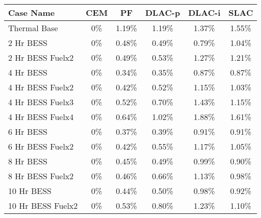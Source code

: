 \begin{tabular}{lccccc}
\toprule
Case Name & CEM & PF & DLAC-p & DLAC-i & SLAC \\
\midrule
Thermal Base & 0\% & 1.19\% & 1.19\% & 1.37\% & 1.55\% \\
2 Hr BESS & 0\% & 0.48\% & 0.49\% & 0.79\% & 1.04\% \\
2 Hr BESS Fuelx2 & 0\% & 0.49\% & 0.53\% & 1.27\% & 1.21\% \\
4 Hr BESS & 0\% & 0.34\% & 0.35\% & 0.87\% & 0.87\% \\
4 Hr BESS Fuelx2 & 0\% & 0.42\% & 0.52\% & 1.15\% & 1.03\% \\
4 Hr BESS Fuelx3 & 0\% & 0.52\% & 0.70\% & 1.43\% & 1.15\% \\
4 Hr BESS Fuelx4 & 0\% & 0.64\% & 1.02\% & 1.88\% & 1.61\% \\
6 Hr BESS & 0\% & 0.37\% & 0.39\% & 0.91\% & 0.91\% \\
6 Hr BESS Fuelx2 & 0\% & 0.42\% & 0.55\% & 1.17\% & 1.05\% \\
8 Hr BESS & 0\% & 0.45\% & 0.49\% & 0.99\% & 0.90\% \\
8 Hr BESS Fuelx2 & 0\% & 0.46\% & 0.66\% & 1.13\% & 0.98\% \\
10 Hr BESS & 0\% & 0.44\% & 0.50\% & 0.98\% & 0.92\% \\
10 Hr BESS Fuelx2 & 0\% & 0.53\% & 0.80\% & 1.23\% & 1.10\% \\
\bottomrule
\end{tabular}
